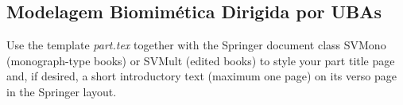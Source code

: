 \begin{partbacktext}
\part{Modelagem Biomimética Dirigida por UBAs}
\noindent Use the template \emph{part.tex} together with the Springer document class SVMono (monograph-type books) or SVMult (edited books) to style your part title page and, if desired, a short introductory text (maximum one page) on its verso page in the Springer layout.

\end{partbacktext}
